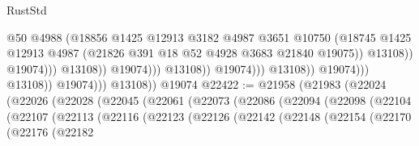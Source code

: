 \begin{lexlean}{RustStd}
\begin{coremodule}
                                                        @50
                                                        @4988
                                                        (@18856
                                                          @1425
                                                          @12913
                                                          @3182
                                                          @4987
                                                          @3651
                                                          @10750
                                                          (@18745
                                                            @1425
                                                            @12913
                                                            @4987
                                                            (@21826
                                                              @391
                                                              @18
                                                              @52
                                                              @4928
                                                              @3683
                                                              @21840
                                                              @19075))
                                                          @13108))
                                                      @19074)))
                                                @13108))
                                            @19074)))
                                      @13108))
                                  @19074)))
                            @13108))
                        @19074)))
                  @13108))
              @19074)))
        @13108))
    @19074
@22422 := @21958
    (@21983
      (@22024
        (@22026
          (@22028
            (@22045
              (@22061
                (@22073
                  (@22086
                    (@22094
                      (@22098
                        (@22104
                          (@22107
                            (@22113
                              (@22116
                                (@22123
                                  (@22126
                                    (@22142
                                      (@22148
                                        (@22154
                                          (@22170
                                            (@22176
                                              (@22182

\end{coremodule}
\end{lexlean}
